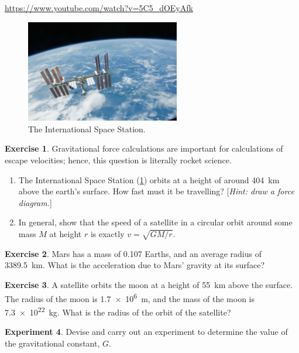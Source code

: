 \documentclass[a4paper]{amsbook}
\newcommand{\goandwatch}[1]{
\begin{center}
\begin{tcolorbox}[width=0.8\textwidth,colback={SkyBlue!20},title={\textbf{Go and watch...}},colbacktitle=MidnightBlue,coltitle=White]
  \textcolor{MidnightBlue}{\url{#1}}
\end{tcolorbox}
\end{center}}
\theoremstyle{definition}
\newtheorem{exercise}{Exercise}
\numberwithin{exercise}{chapter}
\numberwithin{exercise}{chapter}
\newtheorem{experiment}[exercise]{Experiment}
\begin{document}
\goandwatch{https://www.youtube.com/watch?v=5C5_dOEyAfk}

\begin{figure}
  \centering
  \includegraphics[width=0.6\textwidth]{iss}
  \caption{The International Space Station.\label{fig:iss}}
\end{figure}
\begin{exercise}
  Gravitational force calculations are important for calculations of escape velocities; hence, this question is literally rocket science.
  \begin{enumerate}
    \item The International Space Station (\cref{fig:iss}) orbits at a height of around \SI{404}{\kilo\metre} above the earth's surface. How
          fast must it be travelling?  [\emph{Hint: draw a force diagram.}]
    \item In general, show that the speed of a satellite in a circular orbit around some mass $ M $ at height $ r $ is exactly $ v = \sqrt{GM/r} $.
  \end{enumerate}
\end{exercise}

\begin{exercise}
  Mars has a mass of 0.107 Earths, and an average radius of \SI{3389.5}{\kilo\metre}. What is the acceleration due to Mars' gravity
  at its surface?
\end{exercise}

\begin{exercise}
  A satellite orbits the moon at a height of \SI{55}{\kilo\metre} above the surface. The radius of the moon is \SI{1.7e6}{\metre}, and the
  mass of the moon is \SI{7.3e22}{\kilo\gram}. What is the radius of the orbit of the satellite?
\end{exercise}

\begin{experiment}
  Devise and carry out an experiment to determine the value of the gravitational constant, $ G $.
\end{experiment}
\end{document}

